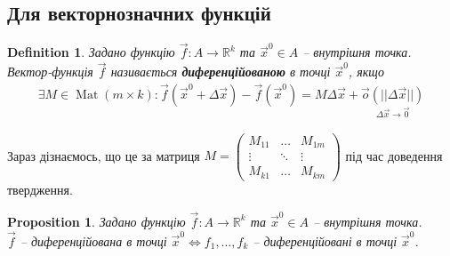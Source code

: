 \documentclass[a4paper, 10pt]{article}
\theoremstyle{theoremdd}
\theoremstyle{theoremdd}
\theoremstyle{theoremdd}
\newtheorem{definition}[theorem]{Definition}
\theoremstyle{theoremdd}
\theoremstyle{theoremdd}
\theoremstyle{theoremdd}
\newtheorem{proposition}[theorem]{Proposition}
\theoremstyle{theoremdd}
\theoremstyle{theoremdd}
\theoremstyle{theoremdd}
\DeclareMathOperator{\Mat}{Mat}
\begin{document}
\subsection{Для векторнозначних функцій}
\begin{definition}
Задано функцію $\vec{f}\colon A \to \mathbb{R}^k$ та $\vec{x}^0 \in A$ -- внутрішня точка.\\
Вектор-функція $\vec{f}$ називається \textbf{диференційованою} в точці $\vec{x}^0$, якщо
\begin{align*}
\exists M \in \Mat(m \times k): \vec{f}(\vec{x}^0 + \Delta \vec{x}) - \vec{f}(\vec{x}^0) = M \Delta \vec{x} + \underset{\Delta \vec{x} \to \vec{0}}{\vec{o}(||\Delta \vec{x}||)}
\end{align*}
\end{definition}
Зараз дізнаємось, що це за матриця $M = \begin{pmatrix}
M_{11} & \dots & M_{1m} \\
\vdots & \ddots & \vdots \\
M_{k1} & \dots & M_{km}
\end{pmatrix}$ під час доведення твердження.

\begin{proposition}
Задано функцію $\vec{f}\colon A \to \mathbb{R}^k$ та $\vec{x}^0 \in A$ -- внутрішня точка.\\
$\vec{f}$ -- диференційована в точці $\vec{x}^0 \iff f_1,\dots,f_k$ -- диференційовані в точці $\vec{x}^0$.
\end{proposition}
\end{document}

